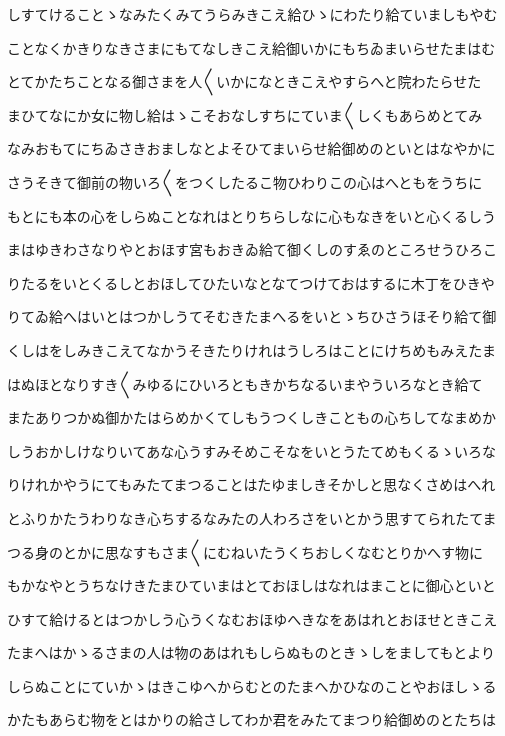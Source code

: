 \documentclass[a4paper,11pt,landscape]{ltjtarticle}
\begin{document}
しすてけることゝなみたくみてうらみきこえ給ひゝにわたり給ていましもやむ
\par\medskip
ことなくかきりなきさまにもてなしきこえ給御いかにもちゐまいらせたまはむ
\par\medskip
とてかたちことなる御さまを人〱いかになときこえやすらへと院わたらせた
\par\medskip
まひてなにか女に物し給はゝこそおなしすちにていま〱しくもあらめとてみ
\par\medskip
なみおもてにちゐさきおましなとよそひてまいらせ給御めのといとはなやかに
\par\medskip
さうそきて御前の物いろ〱をつくしたるこ物ひわりこの心はへともをうちに
\par\medskip
もとにも本の心をしらぬことなれはとりちらしなに心もなきをいと心くるしう
\par\medskip
まはゆきわさなりやとおほす宮もおきゐ給て御くしのすゑのところせうひろこ
\par\medskip
りたるをいとくるしとおほしてひたいなとなてつけておはするに木丁をひきや
\par\medskip
りてゐ給へはいとはつかしうてそむきたまへるをいとゝちひさうほそり給て御
\par\medskip
くしはをしみきこえてなかうそきたりけれはうしろはことにけちめもみえたま
\par\medskip
はぬほとなりすき〱みゆるにひいろともきかちなるいまやういろなとき給て
\par\medskip
またありつかぬ御かたはらめかくてしもうつくしきこともの心ちしてなまめか
\par\medskip
しうおかしけなりいてあな心うすみそめこそなをいとうたてめもくるゝいろな
\par\medskip
りけれかやうにてもみたてまつることはたゆましきそかしと思なくさめはへれ
\par\medskip
とふりかたうわりなき心ちするなみたの人わろさをいとかう思すてられたてま
\par\medskip
つる身のとかに思なすもさま〱にむねいたうくちおしくなむとりかへす物に
\par\medskip
もかなやとうちなけきたまひていまはとておほしはなれはまことに御心といと
\par\medskip
ひすて給けるとはつかしう心うくなむおほゆへきなをあはれとおほせときこえ
\par\medskip
たまへはかゝるさまの人は物のあはれもしらぬものときゝしをましてもとより
\par\medskip
しらぬことにていかゝはきこゆへからむとのたまへかひなのことやおほしゝる
\par\medskip
かたもあらむ物をとはかりの給さしてわか君をみたてまつり給御めのとたちは
\end{document}
